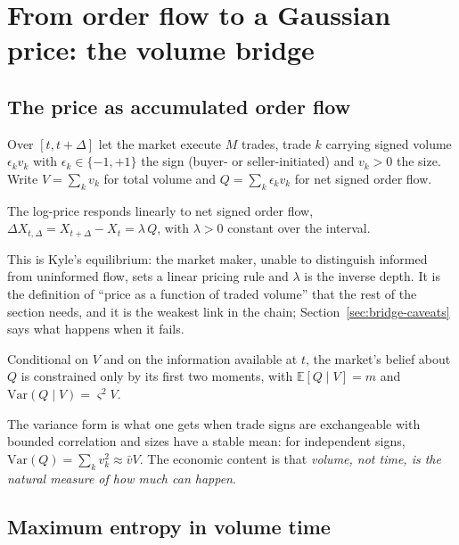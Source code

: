 \section{From order flow to a Gaussian price: the volume bridge}
\label{sec:bridge}

\subsection{The price as accumulated order flow}

Over $[t,t+\Delta]$ let the market execute $M$ trades, trade $k$ carrying signed
volume $\epsilon_k v_k$ with $\epsilon_k\in\{-1,+1\}$ the sign (buyer- or
seller-initiated) and $v_k>0$ the size. Write $V=\sum_k v_k$ for total volume
and $Q=\sum_k \epsilon_k v_k$ for net signed order flow.

\begin{assumption}\label{as:impact}
The log-price responds linearly to net signed order flow,
$\Delta X_{t,\Delta} = X_{t+\Delta}-X_t = \lambda\,Q$, with $\lambda>0$ constant
over the interval.
\end{assumption}

This is Kyle's \citeyearpar{kyle1985} equilibrium: the market maker, unable to
distinguish informed from uninformed flow, sets a linear pricing rule and
$\lambda$ is the inverse depth. It is the definition of ``price as a function of
traded volume'' that the rest of the section needs, and it is the weakest link
in the chain; Section~\ref{sec:bridge-caveats} says what happens when it fails.

\begin{assumption}
\label{as:signs}
Conditional on $V$ and on the information available at $t$, the market's belief
about $Q$ is constrained only by its first two moments, with
$\mathbb{E}[Q\mid V] = m$ and $\mathrm{Var}(Q\mid V) = \varsigma^2 V$.
\end{assumption}

The variance form is what one gets when trade signs are exchangeable with
bounded correlation and sizes have a stable mean: for independent signs,
$\mathrm{Var}(Q)=\sum_k v_k^2 \approx \bar v V$. The economic content is that
\emph{volume, not time, is the natural measure of how much can happen}.

\subsection{Maximum entropy in volume time}

